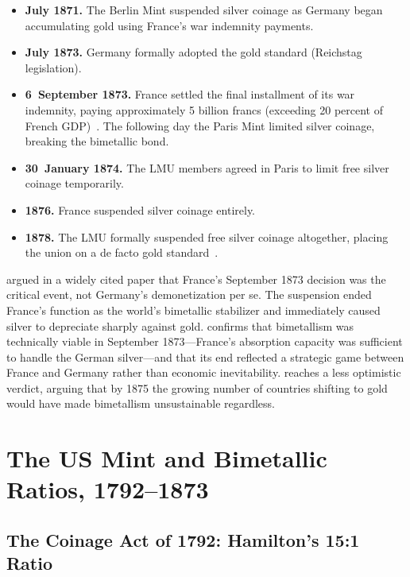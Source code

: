 \documentclass[12pt,letterpaper]{article}
\begin{document}
\begin{itemize}
  \item \textbf{July 1871.}  The Berlin Mint suspended silver coinage as Germany
  began accumulating gold using France's war indemnity payments.
  \item \textbf{July 1873.}  Germany formally adopted the gold standard
  (Reichstag legislation).
  \item \textbf{6~September 1873.}  France settled the final installment of its war
  indemnity, paying approximately 5 billion francs (exceeding 20 percent of French
  GDP)~\citep{wiegand2023}.  The following day the Paris Mint limited silver
  coinage, breaking the bimetallic bond.
  \item \textbf{30~January 1874.}  The LMU members agreed in Paris to limit free
  silver coinage temporarily.
  \item \textbf{1876.}  France suspended silver coinage entirely.
  \item \textbf{1878.}  The LMU formally suspended free silver coinage altogether,
  placing the union on a de facto gold standard~\citep{wikipedia_lmu}.
\end{itemize}

\citet{flandreau1996} argued in a widely cited paper that France's September 1873
decision was the critical event, not Germany's demonetization per se.  The
suspension ended France's function as the world's bimetallic stabilizer and
immediately caused silver to depreciate sharply against gold.  \citet{wiegand2022}
confirms that bimetallism was technically viable in September 1873---France's
absorption capacity was sufficient to handle the German silver---and that its
end reflected a strategic game between France and Germany rather than economic
inevitability.  \citet{meissner2015} reaches a less optimistic verdict, arguing
that by 1875 the growing number of countries shifting to gold would have made
bimetallism unsustainable regardless.

\bigskip

\section{The US Mint and Bimetallic Ratios, 1792--1873}

\subsection{The Coinage Act of 1792: Hamilton's 15:1 Ratio}
\end{document}
